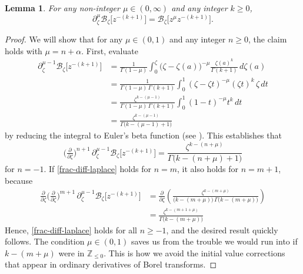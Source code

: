 \documentclass{article}
\newcommand{\Z}{\mathbb{Z}}
\newcommand{\borel}{\mathcal{B}}
\theoremstyle{definition}
\theoremstyle{plain}
\newtheorem{lemma}[definition]{Lemma}
\newenvironment{revised}{\color{DarkBlue}}{\color{black}}
\newenvironment{revised}{}{}
\begin{document}
\begin{lemma}\label{lem:frac-deriv-Borel}
For any non-integer $\mu \in (0, \infty)$ and any integer $k \ge 0$,
\[ \partial^\mu_{\zeta } \borel_\zeta \big[z^{-(k+1)}\big] =  \borel_\zeta \big[z^\mu z^{-(k+1)}\big]. \]
\end{lemma}
\begin{proof}
We will show that for any $\mu \in (0, 1)$ and any integer $n \ge 0$, the claim holds with $\mu = n + \alpha$. First, evaluate
\begin{revised}
\begin{align*}
\partial^{\mu-1}_{\zeta} \borel_\zeta \big[z^{-(k+1)}\big] & = \frac{1}{\Gamma(1-\mu)} \int_0^\zeta \big(\zeta-\zeta(a)\big)^{-\mu} \frac{\zeta(a)^k}{\Gamma(k+1)}\,d\zeta(a) \\
& = \frac{1}{\Gamma(1-\mu)\,\Gamma(k+1)} \int_0^1 (\zeta-\zeta t)^{-\mu} (\zeta t)^k\,\zeta\,dt \\
& = \frac{\zeta^{k-(\mu-1)}}{\Gamma(1-\mu)\,\Gamma(k+1)} \int_0^1 (1-t)^{-\mu} t^k\,dt \\
& = \frac{\zeta^{k-(\mu-1)}}{\Gamma\big(k-(\mu-1)+1\big)}
\end{align*}    
\end{revised}
by reducing the integral to Euler's beta function (see \cite[Identity 5.12.1]{dlmf}). This establishes that
\begin{equation}\label{frac-diff-laplace}
\big(\tfrac{\partial}{\partial \zeta}\big)^{n+1}\,\partial^{\mu-1}_{\zeta } \borel_\zeta \big[z^{-(k+1)}\big] = \frac{\zeta^{k-(n+\mu)}}{\Gamma\big(k-(n+\mu)+1\big)}
\end{equation}
for $n = -1$. If \eqref{frac-diff-laplace} holds for $n = m$, it also holds for $n = m+1$, because
\begin{align*}
\tfrac{\partial}{\partial \zeta} \big(\tfrac{\partial}{\partial \zeta}\big)^{m+1}\,\partial^{\mu-1}_{\zeta} \borel_\zeta \big[z^{-(k+1)}\big] & = \frac{\partial}{\partial \zeta} \left( \frac{\zeta^{k-(m+\mu)}}{\big(k-(m+\mu)\big)\,\Gamma\big(k-(m+\mu)\big)} \right) \\
& = \frac{\zeta^{k-(m+1+\mu)}}{\Gamma\big(k-(m+\mu)\big)}
\end{align*}
Hence, \eqref{frac-diff-laplace} holds for all $n \ge -1$, and the desired result quickly follows. The condition $\mu \in (0, 1)$ saves us from the trouble we would run into if $k-(m+\mu)$ were in $\Z_{\le 0}$. This is how we avoid the initial value corrections that appear in ordinary derivatives of Borel transforms.
\end{proof}
\end{document}
